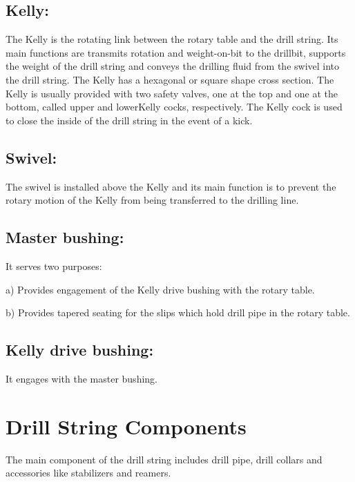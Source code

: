 \vspace{1em}

\subsection*{\textbf{Kelly:}} The Kelly is the rotating link between the rotary table and the drill string.
 Its main functions are transmits rotation and weight-on-bit to the drillbit, supports the
weight of the drill string and conveys the drilling fluid from the swivel into the drill string.
The Kelly has a hexagonal or square shape cross section. The Kelly is usually 
provided with two safety valves, one at the top and one at the bottom, called upper and lowerKelly cocks,
 respectively. The Kelly cock is used to close the inside of the drill string in the event of a kick.
 
 \vspace{1em}
 
\subsection*{\textbf{Swivel:}} The swivel is installed above the Kelly and its main function 
is to prevent the rotary motion of the Kelly from being transferred to the drilling line. 
 
\vspace{1em}

\subsection*{\textbf{Master bushing:}} It serves two purposes:

    a) Provides engagement of the Kelly drive bushing with the rotary table.

    b) Provides tapered seating for the slips which hold drill pipe in the rotary table.

\vspace{1em}

\subsection*{\textbf{Kelly drive bushing:}} It engages with the master bushing.

\section{Drill String Components}

The main component of the drill string includes drill pipe,
drill collars and accessories like stabilizers and reamers.
 	
